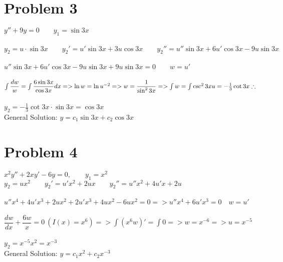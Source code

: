 \documentclass[12pt]{exam}
\begin{document}
\section*{Problem 3}
$y''+9y=0\qquad y_1=\sin{3x}$\\\\
$y_2=u\cdot\sin{3x}\qquad y_2'=u'\sin{3x}+3u\cos{3x}\qquad y_2''=u''\sin{3x}+6u'\cos{3x}-9u\sin{3x}$\\\\
$u''\sin{3x}+6u'\cos{3x}-9u\sin{3x}+9u\sin{3x}=0\qquad w=u'$\\\\
$\int\dfrac{dw}{w}=\int\dfrac{6\sin{3x}}{\cos{3x}}dx=>\ln{w}=\ln{u^{-2}}=>w=\dfrac{1}{\sin^2{3x}}=> \int w=\int\csc^2{3x}\\\\u=-\frac{1}{3}\cot{3x}\therefore$\\\\
$y_2=-\frac{1}{3}\cot{3x}\cdot\sin{3x}=\cos{3x}$\\
General Solution: $y=c_1\sin{3x}+c_2\cos{3x}$
\section*{Problem 4}
$x^2y''+2xy'-6y=0,\qquad y_1=x^2$\\
$y_2=ux^2\qquad y_2'=u'x^2+2ux\qquad y_2''=u''x^2+4u'x+2u$\\\\
$u''x^4+4u'x^3+2ux^2+2u'x^3+4ux^2-6ux^2=0=>u''x^4+6u'x^3=0\quad w=u'$\\\\
$\dfrac{dw}{dx}+\dfrac{6w}{x}=0\:(I(x)=x^6)=>\int(x^6w)'=\int0=>w=x^{-6}=>u=x^{-5}$\\\\
$y_2=x^{-5}x^2=x^{-3}$\\
General Solution: $y=c_1x^2+c_2x^{-3}$
\end{document}
